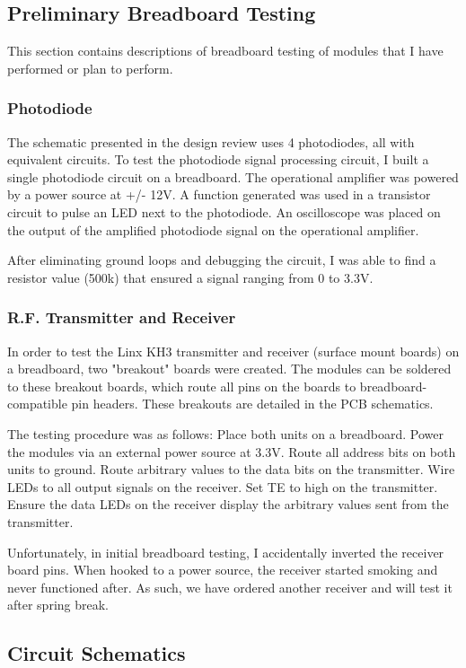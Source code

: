 \documentclass[letterpaper,10pt]{article}
\begin{document}
\begin{spacing}{1.15}
\subsection{Preliminary Breadboard Testing}
This section contains descriptions of breadboard testing of modules that I have performed or plan to perform.

\subsubsection{Photodiode}
The schematic presented in the design review uses 4 photodiodes, all with equivalent circuits. To test the photodiode signal processing circuit, I built a single photodiode circuit on a breadboard. The operational amplifier was powered by a power source at +/- 12V. A function generated was used in a transistor circuit to pulse an LED next to the photodiode. An oscilloscope was placed on the output of the amplified photodiode signal on the operational amplifier. 

After eliminating ground loops and debugging the circuit, I was able to find a resistor value (500k) that ensured a signal ranging from 0 to 3.3V. 

\subsubsection{R.F. Transmitter and Receiver}
In order to test the Linx KH3 transmitter and receiver (surface mount boards) on a breadboard, two "breakout" boards were created. The modules can be soldered to these breakout boards, which route all pins on the boards to breadboard-compatible pin headers. These breakouts are detailed in the PCB schematics. 

The testing procedure was as follows: Place both units on a breadboard. Power the modules via an external power source at 3.3V. Route all address bits on both units to ground. Route arbitrary values to the data bits on the transmitter. Wire LEDs to all output signals on the receiver. Set TE to high on the transmitter. Ensure the data LEDs on the receiver display the arbitrary values sent from the transmitter. 

Unfortunately, in initial breadboard testing, I accidentally inverted the receiver board pins. When hooked to a power source, the receiver started smoking and never functioned after. As such, we have ordered another receiver and will test it after spring break. 

\subsection{Circuit Schematics} \label{section-circuit-schematics}


\end{spacing}
\end{document}
